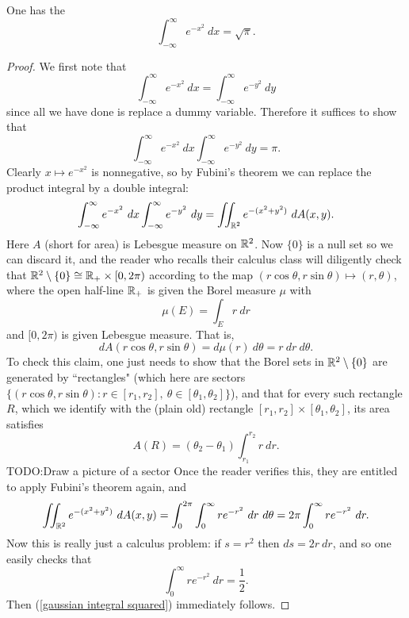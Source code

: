 \begin{corollary}
One has the 
$$\int_{-\infty}^\infty e^{-x^2} ~dx = \sqrt \pi.$$
\end{corollary}
\begin{proof}
We first note that
$$\int_{-\infty}^\infty e^{-x^2}~dx = \int_{-\infty}^\infty e^{-y^2}~dy$$
since all we have done is replace a dummy variable. Therefore it suffices to show that
\begin{equation}
\label{gaussian integral squared}
\int_{-\infty}^\infty e^{-x^2}~dx \int_{-\infty}^\infty e^{-y^2}~dy = \pi.
\end{equation}
Clearly $x \mapsto e^{-x^2}$ is nonnegative, so by Fubini's theorem we can replace the product integral by a double integral:
$$\int_{-\infty}^\infty e^{-x^2}~dx \int_{-\infty}^\infty e^{-y^2}~dy = \iint_{\mathbb{R}^2} e^{-(x^2 + y^2)}~dA(x, y).$$
Here $A$ (short for area) is Lebesgue measure on $\mathbb{R}^2$.
Now $\{0\}$ is a null set so we can discard it, and the reader who recalls their calculus class will diligently check that $\mathbb{R}^2 \setminus \{0\} \cong \mathbb{R}_+ \times [0, 2\pi)$ according to the map $(r \cos \theta, r \sin \theta) \mapsto (r, \theta)$, where the open half-line $\mathbb{R}_+$ is given the Borel measure $\mu$ with
$$\mu(E) = \int_E r~dr$$
and $[0, 2\pi)$ is given Lebesgue measure. That is,
$$dA(r \cos \theta, r \sin \theta) = d\mu(r) ~d\theta = r~dr~d\theta.$$
To check this claim, one just needs to show that the Borel sets in $\mathbb{R}^2 \setminus \{0\}$ are generated by ``rectangles" (which here are sectors $\{(r \cos \theta, r \sin \theta): r \in [r_1, r_2], ~\theta \in [\theta_1, \theta_2]\}$), and that for every such rectangle $R$, which we identify with the (plain old) rectangle $[r_1, r_2] \times [\theta_1, \theta_2]$, its area satisfies
$$A(R) = (\theta_2 - \theta_1)\int_{r_1}^{r_2} r~dr.$$
TODO:Draw a picture of a sector
Once the reader verifies this, they are entitled to apply Fubini's theorem again, and
$$\iint_{\mathbb{R}^2} e^{-(x^2 + y^2)}~dA(x, y) = \int_0^{2\pi} \int_0^\infty re^{-r^2}~dr~d\theta = 2\pi \int_0^\infty re^{-r^2}~dr.$$
Now this is really just a calculus problem: if $s = r^2$ then $ds = 2r~dr$, and so one easily checks that
$$\int_0^\infty re^{-r^2}~dr = \frac{1}{2}.$$
Then (\ref{gaussian integral squared}) immediately follows.
\end{proof}


